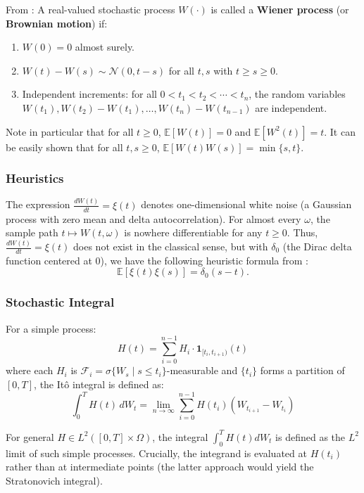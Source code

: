 \documentclass{article}
\begin{document}
	From \cite{ephremidze2025}: A real-valued stochastic process $W(\cdot)$ is called a \textbf{Wiener process} (or \textbf{Brownian motion}) if:
	\begin{enumerate}
		\item $W(0) = 0$ almost surely.
		\item $W(t) - W(s) \sim \mathcal{N}(0, t - s)$ for all $t,s$ with $t \geq s \geq 0$.
		\item Independent increments: for all $0 < t_1 < t_2 < \cdots < t_n$, the random variables $W(t_1), W(t_2) - W(t_1), \dots, W(t_n) - W(t_{n-1})$ are independent.
	\end{enumerate}
	Note in particular that for all $t \geq 0$, $\mathbb{E}[W(t)] = 0$ and $\mathbb{E}[W^2(t)] = t$. It can be easily shown that for all $t, s \geq 0$, $\mathbb{E}[W(t)W(s)] = \min \{s, t\}$.
	
	\subsubsection*{Heuristics}
	
	The expression $\frac{dW(t)}{dt} = \xi(t)$ denotes one-dimensional white noise (a Gaussian process with zero mean and delta autocorrelation). For almost every $\omega$, the sample path $t \mapsto W(t, \omega)$ is nowhere differentiable for any $t \geq 0$. Thus, $\frac{dW(t)}{dt} = \xi(t)$ does not exist in the classical sense, but with $\delta_0$ (the Dirac delta function centered at 0), we have the following heuristic formula from \cite{ephremidze2025}:
	$$\mathbb{E}[\xi(t)\xi(s)] = \delta_0(s - t).$$
	
	\subsubsection*{Stochastic Integral}
	
	For a simple process:
	$$H(t) = \sum_{i=0}^{n-1} H_i \cdot \mathbf{1}_{[t_i, t_{i+1})}(t)$$
	where each $H_i$ is $\mathcal{F}_i = \sigma\{W_s \mid s \leq t_i\}$-measurable and $\{t_i\}$ forms a partition of $[0, T]$, the Itô integral is defined as:
	$$\int_0^T H(t) \, dW_t = \lim_{n \to \infty} \sum_{i=0}^{n-1} H(t_i) (W_{t_{i+1}} - W_{t_i})$$
	
	For general $H \in L^2([0,T] \times \Omega)$, the integral $\int_0^T H(t) dW_t$ is defined as the $L^2$ limit of such simple processes. Crucially, the integrand is evaluated at $H(t_i)$ rather than at intermediate points (the latter approach would yield the Stratonovich integral).
	
\end{document}
